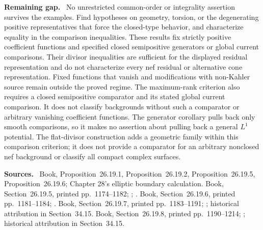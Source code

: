 \documentclass[11pt]{article}
\newcommand{\field}[1]{\par\medskip\noindent\textbf{#1.}\ }
\begin{document}
\field{Remaining gap} No unrestricted common-order or integrality assertion survives the examples. Find hypotheses on geometry, torsion, or the degenerating positive representatives that force the closed-type behavior, and characterize equality in the comparison inequalities. These results fix strictly positive coefficient functions and specified closed semipositive generators or global current comparisons. Their divisor inequalities are sufficient for the displayed residual representation and do not characterize every nef residual or alternative cone representation. Fixed functions that vanish and modifications with non-Kahler source remain outside the proved regime. The maximum-rank criterion also requires a closed semipositive comparator and its stated global current comparison. It does not classify backgrounds without such a comparator or arbitrary vanishing coefficient functions. The generator corollary pulls back only smooth comparisons, so it makes no assertion about pulling back a general $L^1$ potential. The flat-divisor construction adds a geometric family within this comparison criterion; it does not provide a comparator for an arbitrary nonclosed nef background or classify all compact complex surfaces.
\field{Sources} Book, Proposition~26.19.1, Proposition~26.19.2, Proposition~26.19.5, Proposition~26.19.6; Chapter 28's elliptic boundary calculation. Book, Section~26.19.5, printed pp.~1174--1182; ; . Book, Section~26.19.6, printed pp.~1181--1184; . Book, Section~26.19.7, printed pp.~1183--1191; ; historical attribution in Section~34.15. Book, Section~26.19.8, printed pp.~1190--1214; ; historical attribution in Section~34.15.
\end{document}

